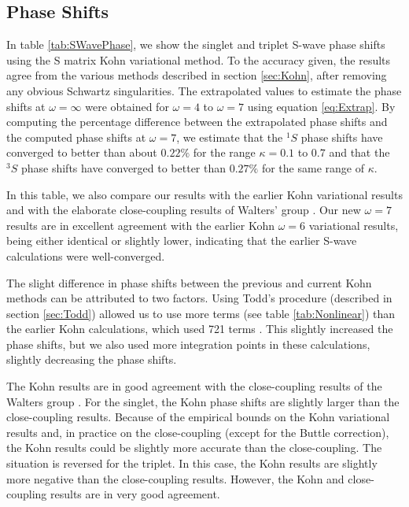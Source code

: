 \documentclass[preprint,showpacs,preprintnumbers,amsmath,amssymb]{revtex4}
\newcommand{\todoi}{\todo[inline]}
\begin{document}
\todoi{Do we need to include terms?}


\subsection{Phase Shifts}

In table \ref{tab:SWavePhase}, we show the singlet and triplet S-wave phase shifts using the S matrix Kohn variational method. To the accuracy given, the results agree from the various methods described in section \ref{sec:Kohn}, after removing any obvious Schwartz singularities. The extrapolated values to estimate the phase shifts at $\omega = \infty$ were obtained for $\omega = 4$ to $\omega = 7$ using equation \ref{eq:Extrap}. By computing the percentage difference between the extrapolated phase shifts and the computed phase shifts at $\omega=7$, we estimate that the $^1S$ phase shifts have converged to better than about $0.22\%$ for the range $\kappa=0.1$ to $0.7$ and that the $^3S$ phase shifts have converged to better than $0.27\%$ for the same range of $\kappa$.

In this table, we also compare our results with the earlier Kohn variational results \cite{VanReeth2003,VanReeth2004} and with the elaborate close-coupling results of Walters' group \cite{Blackwood2002,Walters2004}. Our new $\omega = 7$ results are in excellent agreement with the earlier Kohn $\omega = 6$ variational results, being either identical or slightly lower, indicating that the earlier S-wave calculations were well-converged.


The slight difference in phase shifts between the previous and current Kohn methods can be attributed to two factors. Using Todd's procedure (described in section \ref{sec:Todd}) allowed us to use more terms (see table \ref{tab:Nonlinear}) than the earlier Kohn calculations, which used 721 terms  \cite{VanReeth2003}. This slightly increased the phase shifts, but we also used more integration points in these calculations, slightly decreasing the phase shifts.

The Kohn results are in good agreement with the close-coupling results of the Walters group \cite{Blackwood2002,Walters2004}. For the singlet, the Kohn phase shifts are slightly larger than the close-coupling results. Because of the empirical bounds on the
Kohn variational results and, in practice on
the close-coupling (except for the Buttle
correction), the Kohn results could be
slightly more accurate than the close-coupling.
The situation is reversed for the triplet.
In this case, the Kohn results are slightly
more negative than the close-coupling results.
However, the Kohn and close-coupling results are
in very good agreement.
\end{document}
